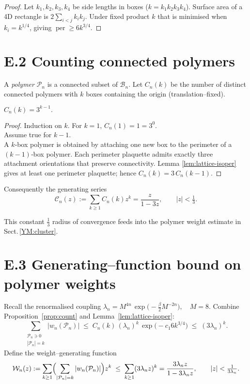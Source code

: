 \begin{proof}
Let $k_{1},k_{2},k_{3},k_{4}$ be side lengths in boxes
($k=k_{1}k_{2}k_{3}k_{4}$).  Surface area of a 4D rectangle is
\(2\sum_{i<j}k_{i}k_{j}.\)  Under fixed product $k$ that is minimised
when $k_{i}=k^{1/4}$, giving
\(\operatorname{per}\ge 6k^{3/4}.\)
\end{proof}

\bigskip
\section*{E.2  Counting connected polymers}

A \emph{polymer} $\mathcal P_{n}$ is a connected subset of $\mathscr B_{n}$.
Let $C_{n}(k)$ be the number of distinct connected polymers with $k$
boxes containing the origin (translation–fixed).

\begin{proposition}\label{prop:count}
\(
C_{n}(k)=3^{k-1}.
\)
\end{proposition}

\begin{proof}
Induction on $k$.  For $k=1$, $C_{n}(1)=1=3^{0}$.  \\
Assume true for $k-1$.  \\
A $k$‐box polymer is obtained by attaching one new box to the perimeter
of a $(k-1)$‐box polymer.  Each perimeter plaquette admits exactly
three attachment orientations that preserve connectivity.  Lemma
\ref{lem:lattice-isoper} gives at least one perimeter plaquette; hence
\(C_{n}(k)=3\,C_{n}(k-1).\)
\end{proof}

Consequently the generating series
\[
\mathcal C_{n}(z):=\sum_{k\ge1}C_{n}(k)z^{k}
  =\frac{z}{1-3z},\qquad |z|<\tfrac13 .
\]

This constant $\tfrac13$ radius of convergence feeds into the polymer
weight estimate in Sect.\,\ref{YM:cluster}.

\bigskip
\section*{E.3  Generating–function bound on polymer weights}

Recall the renormalised coupling
\(
\lambda_{n}
   = M^{4n}\,\exp\!\bigl(-\tfrac{\beta}{2}M^{-2n}\bigr),
   \quad M=8.
\)
Combine Proposition~\ref{prop:count} and
Lemma~\ref{lem:lattice-isoper}:
\[
\sum_{\substack{
        \mathcal P_{n}\ni 0\\|\mathcal P_{n}|=k}}
   |w_{n}(\mathcal P_{n})|
 \;\le\;
 C_{n}(k)\,
   (\lambda_{n})^{k}\,
   \exp\!\bigl(-c_{1}6 k^{3/4}\bigr)
 \;\le\;
 (3\lambda_{n})^{k}.
\]
Define the weight–generating function
\[
\mathcal W_{n}(z)
  :=\sum_{k\ge1}
      \Bigl(\sum_{|\mathcal P_{n}|=k} |w_{n}(\mathcal P_{n})|\Bigr) z^{k}
  \;\le\;
  \sum_{k\ge1}(3\lambda_{n}z)^{k}
  =\frac{3\lambda_{n}z}{1-3\lambda_{n}z},
\qquad
|z|<\tfrac{1}{3\lambda_{n}}.
\]


